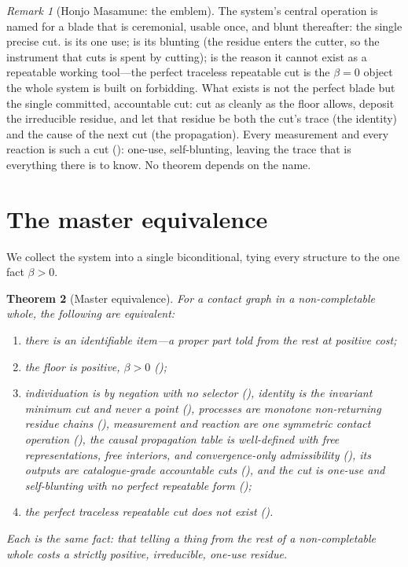 \documentclass[11pt,a4paper]{article}
\theoremstyle{thmstyle}
\newtheorem{theorem}{Theorem}[section]
\theoremstyle{definition}
\theoremstyle{remark}
\newtheorem{remark}[theorem]{Remark}
\newcommand{\flo}{\beta}                 %
\begin{document}
\begin{remark}[Honjo Masamune: the emblem]
\label{rem:honjo}
The system's central operation is named for a blade that is ceremonial,
usable once, and blunt thereafter: the single precise cut. 
is its one use;  is its blunting (the residue enters the
cutter, so the instrument that cuts is spent by cutting); 
is the reason it cannot exist as a repeatable working tool---the perfect
traceless repeatable cut is the $\flo=0$ object the whole system is built on
forbidding. What exists is not the perfect blade but the single committed,
accountable cut: cut as cleanly as the floor allows, deposit the
irreducible residue, and let that residue be both the cut's trace (the
identity) and the cause of the next cut (the propagation). Every
measurement and every reaction is such a cut ():
one-use, self-blunting, leaving the trace that is everything there is to
know. No theorem depends on the name.
\end{remark}

\section{The master equivalence}
\label{sec:master}

We collect the system into a single biconditional, tying every structure to
the one fact $\flo>0$.

\begin{theorem}[Master equivalence]
\label{thm:master}
For a contact graph in a non-completable whole, the following are
equivalent:
\begin{enumerate}[label=\textup{(\roman*)},leftmargin=2.2em]
\item there is an identifiable item---a proper part told from the rest at
positive cost;
\item the floor is positive, $\flo>0$ ();
\item individuation is by negation with no selector (),
identity is the invariant minimum cut and never a point
(), processes are monotone non-returning residue chains
(), measurement and reaction are one
symmetric contact operation (), the causal
propagation table is well-defined with free representations, free interiors,
and convergence-only admissibility (), its outputs are
catalogue-grade accountable cuts (), and the cut
is one-use and self-blunting with no perfect repeatable form
();
\item the perfect traceless repeatable cut does not exist
().
\end{enumerate}
Each is the same fact: that telling a thing from the rest of a
non-completable whole costs a strictly positive, irreducible, one-use
residue.
\end{theorem}
\end{document}
